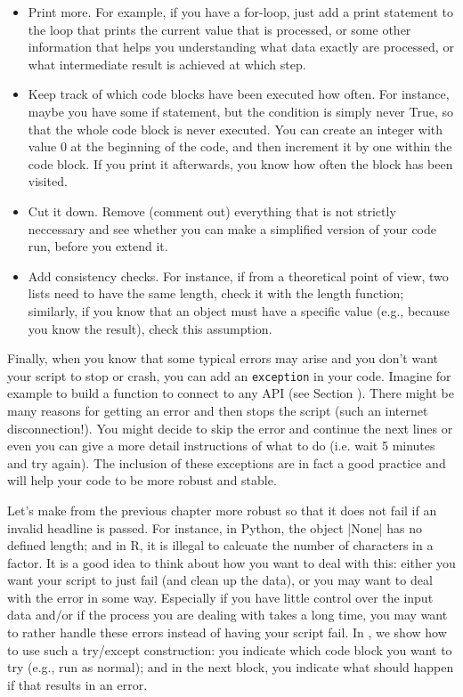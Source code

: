 \begin{itemize}
  \item Print more. For example, if you have a for-loop, just add a print statement to the loop that prints the current value that is processed, or some other information that helps you understanding what data exactly are processed, or what intermediate result is achieved at which step.
  \item Keep track of which code blocks have been executed how often. For instance, maybe you have some if statement, but the condition is simply never True, so that the whole code block is never executed. You can create an integer with value 0 at the beginning of the code, and then increment it by one within the code block. If you print it afterwards, you know how often the block has been visited.
  \item Cut it down. Remove (comment out) everything that is not strictly neccessary and see whether you can make a simplified version of your code run, before you extend it.
  \item Add consistency checks. For instance, if from a theoretical point of view, two lists need to have the same length, check it with the length function; similarly, if you know that an object must have a specific value (e.g., because you know the result), check this assumption.
\end{itemize}


Finally, when you know that some typical errors may arise and you don't want your script to stop or crash, you can add an \texttt{exception} in your code. Imagine for example to build a function to connect to any API (see Section ). There might be many reasons for getting an error and then stops the script (such an internet disconnection!). You might decide to skip  the error and continue the next lines or even you can give a more detail instructions of what to do (i.e. wait 5 minutes and try again). The inclusion of these exceptions are in fact a good practice and will help your code to be more robust and stable.

Let's make  from the previous chapter more robust so that it does not fail if an invalid headline is passed. For instance, in Python, the object |None| has no defined length; and in R, it is illegal to calcuate the number of characters in a factor. It is a good idea to think about how you want to deal with this: either you want your script to just fail (and clean up the data), or you may want to deal with the error in some way. Especially if you have little control over the input data and/or if the process you are dealing with takes a long time, you may want to rather handle these errors instead of having your script fail. In , we show how to use such a try/except construction: you indicate which code block you want to try (e.g., run as normal); and in the next block, you indicate what should happen if that results in an error. 

